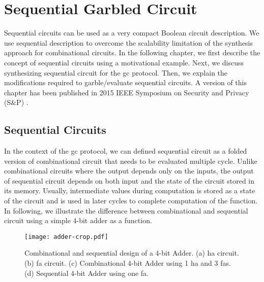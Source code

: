 \chapter{Sequential Garbled Circuit}\label{chap:seq}
Sequential circuits can be used as a very compact Boolean circuit description. We use sequential description to overcome the scalability limitation of the synthesis approach for combinational circuits.
In the following chapter, we first describe the concept of sequential circuits using a motivational example.
Next, we discuss synthesizing sequential circuit for the \acrshort{gc} protocol.
Then, we explain the modifications required to garble/evaluate sequential circuits.
A version of this chapter has been published in 2015 IEEE Symposium on Security and Privacy (S\&P) \cite{songhori2015tinygarble}.

\section{Sequential Circuits}\label{sec:seq-seq}
In the context of the \acrshort{gc} protocol, we can defined sequential circuit as a folded version of combinational circuit that needs to be evaluated multiple cycle.
Unlike combinational circuits where the output depends only on the inputs, the output of sequential circuit depends on both input and the state of the circuit stored in its memory.
Usually, intermediate values during computation is stored as a state of the circuit and is used in later cycles to complete computation of the function.
In following, we illustrate the difference between combinational and sequential circuit using a simple 4-bit adder as a function.

\begin{figure}
    \centering
    \texttt{[image: adder-crop.pdf]}
    \caption{Combinational and sequential design of a 4-bit Adder.
  (a) \acrshort{ha} circuit.
  (b) \acrshort{fa} circuit.
  (c) Combinational 4-bit Adder using 1 \acrshort{ha} and 3 \acrshort{fa}s.
  (d) Sequential 4-bit Adder using one \acrshort{fa}.}\label{fig:combSeq}
\end{figure}

